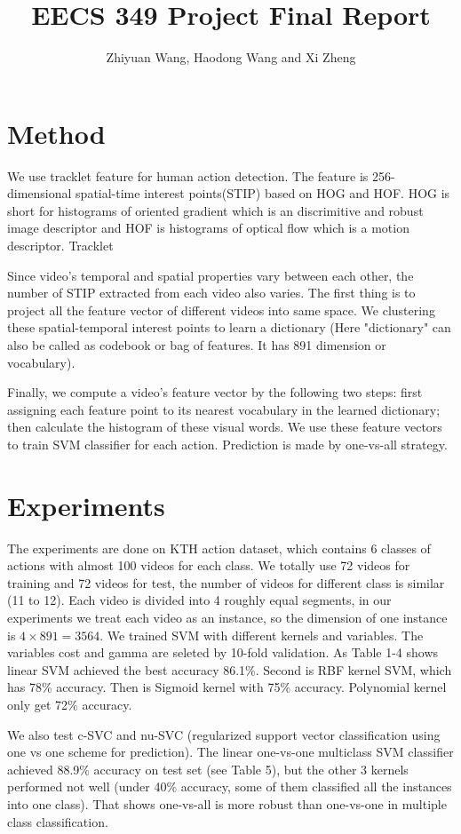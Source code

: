 \documentclass{article}
\begin{document}
\title{EECS 349 Project Final Report}
\author{Zhiyuan Wang, Haodong Wang and Xi Zheng}
\maketitle
\section{Method}
We use tracklet feature for human action detection. The feature is 256-dimensional spatial-time interest points(STIP) based on HOG and HOF. HOG is short for histograms of oriented gradient which is an discrimitive and robust image descriptor and HOF is histograms of optical flow which is a motion descriptor.  Tracklet

Since video's temporal and spatial properties vary between each other, the number of STIP extracted from each video also varies. The first thing is to project all the feature vector of different videos into same space. We clustering these spatial-temporal interest points to learn a dictionary (Here "dictionary" can also be called as codebook or bag of features. It has 891 dimension or vocabulary). 

Finally, we compute a video's feature vector by the following two steps: first assigning each feature point to its nearest vocabulary in the learned dictionary; then calculate the histogram of these visual words. We use these feature vectors to train SVM classifier for each action. Prediction is made by one-vs-all strategy. 
\section{Experiments}
The experiments are done on KTH action dataset, which contains 6 classes of actions with almost 100 videos for each class. We totally use 72 videos for training and 72 videos for test, the number of videos for different class is similar (11 to 12). Each video is divided into 4 roughly equal segments, in our experiments we treat each video as an instance, so the dimension of one instance is $4\times 891 = 3564$. We trained SVM with different kernels and variables. The variables cost and gamma are seleted by 10-fold validation.  As Table 1-4 shows linear SVM achieved the best accuracy 86.1\%. Second is RBF kernel SVM, which has 78\% accuracy. Then is Sigmoid kernel with 75\% accuracy. Polynomial kernel only get 72\% accuracy. 

We also test c-SVC and nu-SVC (regularized support vector classification using one vs one scheme for prediction). The linear one-vs-one multiclass SVM classifier achieved 88.9\% accuracy on test set (see Table 5), but the other 3 kernels performed not well (under 40\% accuracy, some of them classified all the instances into one class). That shows one-vs-all is more robust than one-vs-one in multiple class classification.
\end{document}
